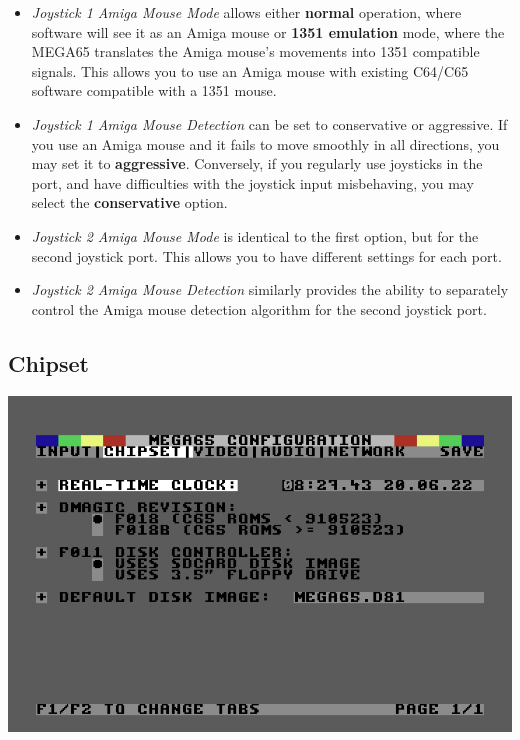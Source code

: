 \begin{itemize}
  \item{\em Joystick 1 Amiga Mouse Mode} allows either {\bf normal} operation,
  where software will see it as an Amiga mouse or {\bf 1351 emulation} mode, where the MEGA65 translates the Amiga mouse's movements into 1351 compatible  signals. This allows you to use an Amiga mouse with existing C64/C65 software compatible with a 1351 mouse.
  \item{\em Joystick 1 Amiga Mouse Detection} can be set to conservative or aggressive. If you use an Amiga mouse and it fails to move smoothly in all directions, you may set it to {\bf aggressive}. Conversely, if you regularly use joysticks in the port, and have difficulties with the joystick input misbehaving, you may select the {\bf conservative} option.
  \item{\em Joystick 2 Amiga Mouse Mode} is identical to the first option, but for the second joystick port. This allows you to have different settings for each port.
  \item{\em Joystick 2 Amiga Mouse Detection} similarly provides the ability to separately control the Amiga mouse detection algorithm for the second joystick port.
\end{itemize}


\subsection{Chipset}

\begin{center}
\includegraphics[width=0.7\linewidth]{images/ss-m65config-2.png}
\end{center}

